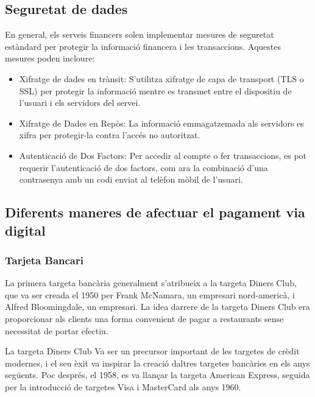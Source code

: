 \subsection*{Seguretat de dades}


En general, els serveis financers solen implementar mesures de seguretat estàndard per protegir la informació financera i les transaccions. Aquestes mesures poden incloure:

\begin{itemize}
    \item Xifratge de dades en trànsit: S'utilitza xifratge de capa de transport (TLS o SSL) per protegir la informació mentre es transmet entre el dispositiu de l'usuari i els servidors del servei.
    \item Xifratge de Dades en Repòs: La informació emmagatzemada als servidors es xifra per protegir-la contra l'accés no autoritzat.
    \item Autenticació de Dos Factors: Per accedir al compte o fer transaccions, es pot requerir l'autenticació de dos factors, com ara la combinació d'una contrasenya amb un codi enviat al telèfon mòbil de l'usuari.
\end{itemize}



\subsection*{Diferents maneres de afectuar el pagament via digital}



\subsubsection*{Tarjeta Bancari}


La primera targeta bancària generalment s'atribueix a la targeta Diners Club, que va ser creada el 1950 per Frank McNamara, un empresari nord-americà, i Alfred Bloomingdale, un empresari. La idea darrere de la targeta Diners Club era proporcionar als clients una forma convenient de pagar a restaurants sense necessitat de portar efectiu.

La targeta Diners Club Va ser un precursor important de les targetes de crèdit modernes, i el seu èxit va inspirar la creació daltres targetes bancàries en els anys següents. Poc després, el 1958, es va llançar la targeta American Express, seguida per la introducció de targetes Visa i MasterCard als anys 1960.


